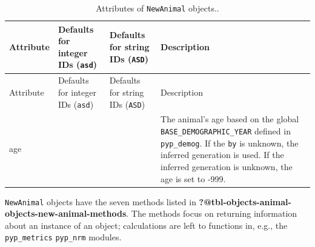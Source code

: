 \documentclass[
  letterpaper,
  DIV=11,
  numbers=noendperiod]{scrreprt}
\begin{document}
\begin{longtable}[]{@{}
  >{\raggedright\arraybackslash}p{}
  >{\raggedright\arraybackslash}p{}
  >{\raggedright\arraybackslash}p{}
  >{\raggedright\arraybackslash}p{}@{}}
\caption{Attributes of \texttt{NewAnimal}
objects..}\label{tbl-objects-animal-objects-new-animal-attributes}\tabularnewline
\toprule\noalign{}
\begin{minipage}[b]{\linewidth}\raggedright
Attribute
\end{minipage} & \begin{minipage}[b]{\linewidth}\raggedright
Defaults for integer IDs (\texttt{asd})
\end{minipage} & \begin{minipage}[b]{\linewidth}\raggedright
Defaults for string IDs (\texttt{ASD})
\end{minipage} & \begin{minipage}[b]{\linewidth}\raggedright
Description
\end{minipage} \\
\midrule\noalign{}
\endfirsthead
\toprule\noalign{}
\begin{minipage}[b]{\linewidth}\raggedright
Attribute
\end{minipage} & \begin{minipage}[b]{\linewidth}\raggedright
Defaults for integer IDs (\texttt{asd})
\end{minipage} & \begin{minipage}[b]{\linewidth}\raggedright
Defaults for string IDs (\texttt{ASD})
\end{minipage} & \begin{minipage}[b]{\linewidth}\raggedright
Description
\end{minipage} \\
\midrule\noalign{}
\endhead
\bottomrule\noalign{}
\endlastfoot
age & -999 & -999 & The animal's age based on the global
\texttt{BASE\_DEMOGRAPHIC\_YEAR} defined in \texttt{pyp\_demog}. If the
\texttt{by} is unknown, the inferred generation is used. If the inferred
generation is unknown, the age is set to -999. \\
\end{longtable}

\texttt{NewAnimal} objects have the seven methods listed in
\textbf{?@tbl-objects-animal-objects-new-animal-methods}. The methods
focus on returning information about an instance of an object;
calculations are left to functions in, e.g., the \texttt{pyp\_metrics}
\texttt{pyp\_nrm} modules.
\end{document}
